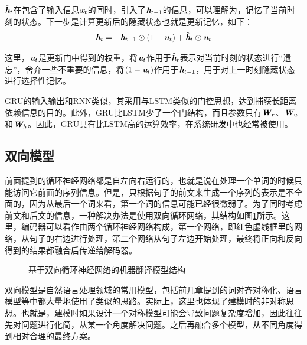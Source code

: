 \parinterval $\hat{\textbf{\em h}}_t$在包含了输入信息$\textbf{\em x}_t$的同时，引入了$\textbf{\em h}_{t-1}$的信息，可以理解为，记忆了当前时刻的状态。下一步是计算更新后的隐藏状态也就是更新记忆，如下：
\begin{eqnarray}
\textbf{\em h}_t &=& \textbf{\em h}_{t-1} \odot (1-\textbf{\em u}_t)  + \hat{\textbf{\em h}}_t \odot \textbf{\em u}_t 
\label{eq:10-15}
\end{eqnarray}

\noindent 这里，$\textbf{\em u}_t$是更新门中得到的权重，将$\textbf{\em u}_t$作用于$\hat{\textbf{\em h}}_t$表示对当前时刻的状态进行“遗忘”，舍弃一些不重要的信息，将$(1-\textbf{\em u}_t)$作用于$\textbf{\em h}_{t-1}$，用于对上一时刻隐藏状态进行选择性记忆。

\parinterval GRU的输入输出和RNN类似，其采用与LSTM类似的门控思想，达到捕获长距离依赖信息的目的。此外，GRU比LSTM少了一个门结构，而且参数只有$\textbf{\em W}_r$、$\textbf{\em W}_u$和$\textbf{\em W}_h$。因此，GRU具有比LSTM高的运算效率，在系统研发中也经常被使用。


\subsection{双向模型}

\parinterval 前面提到的循环神经网络都是自左向右运行的，也就是说在处理一个单词的时候只能访问它前面的序列信息。但是，只根据句子的前文来生成一个序列的表示是不全面的，因为从最后一个词来看，第一个词的信息可能已经很微弱了。为了同时考虑前文和后文的信息，一种解决办法是使用双向循环网络，其结构如图\ref{fig:10-14}所示。这里，编码器可以看作由两个循环神经网络构成，第一个网络，即红色虚线框里的网络，从句子的右边进行处理，第二个网络从句子左边开始处理，最终将正向和反向得到的结果都融合后传递给解码器。

\begin{figure}[htp]
\centering

\caption{基于双向循环神经网络的机器翻译模型结构}
\label{fig:10-14}
\end{figure}

\parinterval 双向模型是自然语言处理领域的常用模型，包括前几章提到的词对齐对称化、语言模型等中都大量地使用了类似的思路。实际上，这里也体现了建模时的非对称思想。也就是，建模时如果设计一个对称模型可能会导致问题复杂度增加，因此往往先对问题进行化简，从某一个角度解决问题。之后再融合多个模型，从不同角度得到相对合理的最终方案。

